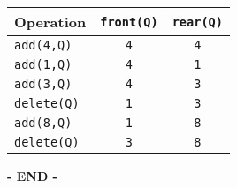 \documentclass[12pt]{article}
\begin{document}
\begin{table}[H]
  \centering
  \begin{tabular}{l|c|c}
      \toprule
      Operation &  \verb|front(Q)| & \verb|rear(Q)| \\
    \midrule
      \verb|add(4,Q)| & \verb|4| & \verb|4|  \\
      \verb|add(1,Q)| & \verb|4| & \verb|1|  \\
      \verb|add(3,Q)| & \verb|4| & \verb|3|  \\
      \verb|delete(Q)| & \verb|1| & \verb|3|  \\
      \verb|add(8,Q)| & \verb|1| & \verb|8|  \\
      \verb|delete(Q)| & \verb|3| & \verb|8|  \\
      \bottomrule
  \end{tabular}
\end{table}


\vfill\centering\textbf{- END -}
\end{document}
